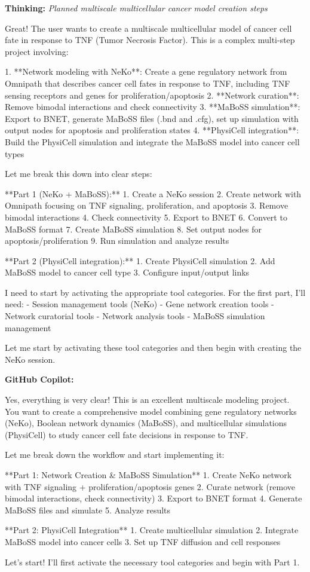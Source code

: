 \documentclass[11pt,a4paper]{article}
\begin{document}
\begin{thinkbox}
\textbf{Thinking:} \textit{Planned multiscale multicellular cancer model creation steps}

Great! The user wants to create a multiscale multicellular model of cancer cell fate in response to TNF (Tumor Necrosis Factor). This is a complex multi-step project involving:

1. **Network modeling with NeKo**: Create a gene regulatory network from Omnipath that describes cancer cell fates in response to TNF, including TNF sensing receptors and genes for proliferation/apoptosis
2. **Network curation**: Remove bimodal interactions and check connectivity
3. **MaBoSS simulation**: Export to BNET, generate MaBoSS files (.bnd and .cfg), set up simulation with output nodes for apoptosis and proliferation states
4. **PhysiCell integration**: Build the PhysiCell simulation and integrate the MaBoSS model into cancer cell types

Let me break this down into clear steps:

**Part 1 (NeKo + MaBoSS):**
1. Create a NeKo session
2. Create network with Omnipath focusing on TNF signaling, proliferation, and apoptosis
3. Remove bimodal interactions 
4. Check connectivity
5. Export to BNET
6. Convert to MaBoSS format
7. Create MaBoSS simulation
8. Set output nodes for apoptosis/proliferation
9. Run simulation and analyze results

**Part 2 (PhysiCell integration):**
1. Create PhysiCell simulation
2. Add MaBoSS model to cancer cell type
3. Configure input/output links

I need to start by activating the appropriate tool categories. For the first part, I'll need:
- Session management tools (NeKo)
- Gene network creation tools
- Network curatorial tools  
- Network analysis tools
- MaBoSS simulation management

Let me start by activating these tool categories and then begin with creating the NeKo session.

\end{thinkbox}
\begin{copilotbox}
\textbf{GitHub Copilot:}

Yes, everything is very clear! This is an excellent multiscale modeling project. You want to create a comprehensive model combining gene regulatory networks (NeKo), Boolean network dynamics (MaBoSS), and multicellular simulations (PhysiCell) to study cancer cell fate decisions in response to TNF.

Let me break down the workflow and start implementing it:

**Part 1: Network Creation \& MaBoSS Simulation**
1. Create NeKo network with TNF signaling + proliferation/apoptosis genes
2. Curate network (remove bimodal interactions, check connectivity)
3. Export to BNET format
4. Generate MaBoSS files and simulate
5. Analyze results

**Part 2: PhysiCell Integration**
1. Create multicellular simulation
2. Integrate MaBoSS model into cancer cells
3. Set up TNF diffusion and cell responses

Let's start! I'll first activate the necessary tool categories and begin with Part 1.

\end{copilotbox}
\end{document}
